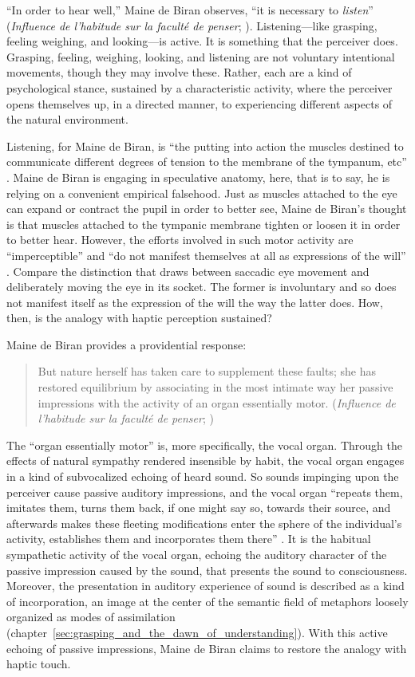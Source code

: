 ``In order to hear well,'' Maine de Biran observes, ``it is necessary to \emph{listen}'' (\emph{Influence de l'habitude sur la faculté de penser}; \citealt[63--4]{Boehm:1929aa}). Listening---like grasping, feeling weighing, and looking---is active. It is something that the perceiver does. Grasping, feeling, weighing, looking, and listening are not voluntary intentional movements, though they may involve these. Rather, each are a kind of psychological stance, sustained by a characteristic activity, where the perceiver opens themselves up, in a directed manner, to experiencing different aspects of the natural environment.

Listening, for Maine de Biran, is ``the putting into action the muscles destined to communicate different degrees of tension to the membrane of the tympanum, etc'' \citep[64]{Boehm:1929aa}. Maine de Biran is engaging in speculative anatomy, here, that is to say, he is relying on a convenient empirical falsehood. Just as muscles attached to the eye can expand or contract the pupil in order to better see, Maine de Biran's thought is that muscles attached to the tympanic membrane tighten or loosen it in order to better hear. However, the efforts involved in such motor activity are ``imperceptible'' and ``do not manifest themselves at all as expressions of the will'' \citep[64]{Boehm:1929aa}. Compare the distinction that \citet[]{Smith:2002sa} draws between saccadic eye movement and deliberately moving the eye in its socket. The former is involuntary and so does not manifest itself as the expression of the will the way the latter does. How, then, is the analogy with haptic perception sustained? 

Maine de Biran provides a providential response:
\begin{quote}
	But nature herself has taken care to supplement these faults; she has restored equilibrium by associating in the most intimate way her passive impressions with the activity of an organ essentially motor. (\emph{Influence de l'habitude sur la faculté de penser}; \citealt[63--4]{Boehm:1929aa})
\end{quote}
The ``organ essentially motor'' is, more specifically, the vocal organ. Through the effects of natural sympathy rendered insensible by habit, the vocal organ engages in a kind of subvocalized echoing of heard sound. So sounds impinging upon the perceiver cause passive auditory impressions, and the vocal organ ``repeats them, imitates them, turns them back, if one might say so, towards their source, and afterwards makes these fleeting modifications enter the sphere of the individual's activity, establishes them and incorporates them there'' \citep[64]{Boehm:1929aa}. It is the habitual sympathetic activity of the vocal organ, echoing the auditory character of the passive impression caused by the sound, that presents the sound to consciousness. Moreover, the presentation in auditory experience of sound is described as a kind of incorporation, an image at the center of the semantic field of metaphors loosely organized as modes of assimilation (chapter~\ref{sec:grasping_and_the_dawn_of_understanding}). With this active echoing of passive impressions, Maine de Biran claims to restore the analogy with haptic touch.

